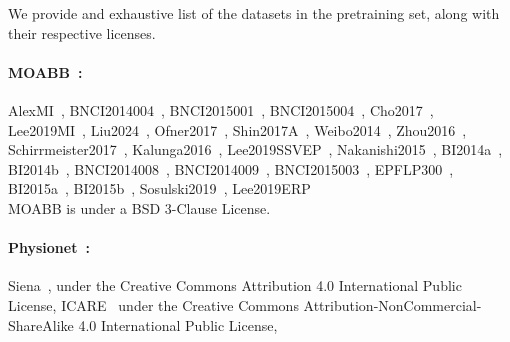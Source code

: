 \documentclass{article}
\begin{document}
\label{app:datasets}
We provide and exhaustive list of the datasets in the pretraining set, along with their respective licenses.

\paragraph{MOABB~\citep{Aristimunha_Mother_of_all_2023}:} AlexMI~\citep{AlexMI}, BNCI2014004~\citep{BNCI2014004}, BNCI2015001~\citep{BNCI2015001}, BNCI2015004~\citep{BNCI2015004}, Cho2017~\citep{Cho2017}, Lee2019MI~\citep{Lee2019}, Liu2024~\citep{Liu2024}, Ofner2017~\citep{Ofner2017}, Shin2017A~\citep{Shin2017A}, Weibo2014~\citep{Weibo2014}, Zhou2016~\citep{Zhou2016}, Schirrmeister2017~\citep{Schirrmeister2017}, Kalunga2016~\citep{Kalunga2016}, Lee2019SSVEP~\citep{Lee2019}, Nakanishi2015~\citep{Nakanishi2015}, BI2014a~\citep{BI2014a}, BI2014b~\citep{BI2014b}, BNCI2014008~\citep{BNCI2014008}, BNCI2014009~\citep{BNCI2014009}, BNCI2015003~\citep{BNCI2015003}, EPFLP300~\citep{EPFLP300}, BI2015a~\citep{BI2015a}, BI2015b~\citep{BI2014b}, Sosulski2019~\citep{Sosulski2019}, Lee2019ERP~\citep{Lee2019}
\\
MOABB is under a BSD 3-Clause License.

\paragraph{Physionet~\citep{goldberger2000physiobank}:} Siena~\citep{detti2020siena,detti2020eeg}, under the Creative Commons Attribution 4.0 International Public License, ICARE~\citep{amorim2023care} under the Creative Commons Attribution-NonCommercial-ShareAlike 4.0 International Public License,
\end{document}
